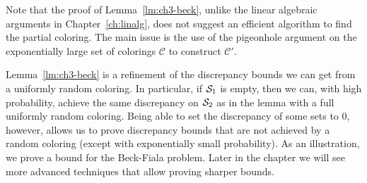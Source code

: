 Note that the proof of
Lemma~\ref{lm:ch3-beck}, unlike the linear algebraic arguments in
Chapter~\ref{ch:linalg}, does not suggest an efficient algorithm to
find the partial coloring. The main issue is the use of the pigeonhole
argument on the exponentially large set of colorings \(\mathcal{C}\)
to construct $\mathcal{C}'$.

Lemma~\ref{lm:ch3-beck} is a refinement of the discrepancy bounds we can
get from a uniformly random coloring. In particular, if $\mathcal{S}_1$ is
empty, then we can, with high probability, achieve the same
discrepancy on $\mathcal{S}_2$ as in the lemma with a full uniformly random
coloring. Being able to set the discrepancy of some sets to $0$,
however, allows us to prove discrepancy bounds that are not achieved
by a random coloring (except with exponentially small probability). As an illustration, we
prove a bound for the Beck-Fiala problem. Later in the chapter
we will see more advanced techniques that allow proving sharper
bounds. 

